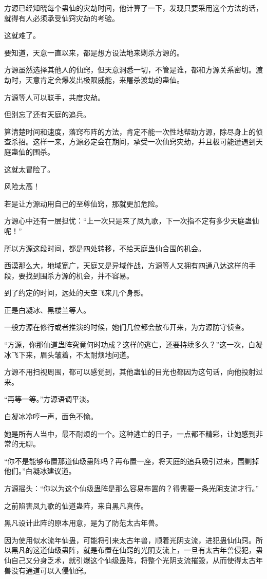 \begin{this_body}
方源已经知晓每个蛊仙的灾劫时间，他计算了一下，发现只要采用这个方法的话，就得有人必须承受仙窍灾劫的考验。

这就难了。

要知道，天意一直以来，都是想方设法地来剿杀方源的。

方源虽然选择其他人的仙窍，但天意洞悉一切，不管是谁，都和方源关系密切。渡劫时，天意肯定会爆发出极限威能，来屠杀渡劫的蛊仙。

方源等人可以联手，共度灾劫。

但别忘了还有天庭的追兵。

算清楚时间和速度，落窍布阵的方法，肯定不能一次性地帮助方源，除尽身上的侦查杀招。这样一来，方源必定会在期间，承受一次仙窍灾劫，并且极可能遭遇到天庭蛊仙的围杀。

这就太冒险了。

风险太高！

若是让方源动用自己的至尊仙窍，那就更加危险。

方源心中还有一层担忧：“上一次只是来了凤九歌，下一次指不定有多少天庭蛊仙呢！”

所以方源这段时间，都是四处转移，不给天庭蛊仙合围的机会。

西漠那么大，地域宽广，天庭又是异域作战，方源等人又拥有四通八达这样的手段，要找到围杀方源的机会，并不容易。

到了约定的时间，远处的天空飞来几个身影。

正是白凝冰、黑楼兰等人。

一般方源在修行或者推演的时候，她们几位都会散布开来，为方源防守侦查。

“方源，你那仙道蛊阵究竟何时功成？这样的逃亡，还要持续多久？”这一次，白凝冰飞下来，眉头皱着，不太耐烦地问道。

方源不用扫视周围，都可以感觉到，其他蛊仙的目光也都因为这句话，向他投射过来。

“再等一等。”方源语调平淡。

白凝冰冷哼一声，面色不愉。

她是所有人当中，最不耐烦的一个。这种逃亡的日子，一点都不精彩，让她感到非常的无聊。

“你不是能够布置那道仙级蛊阵吗？再布置一座，将天庭的追兵吸引过来，围剿掉他们。”白凝冰建议道。

方源摇头：“你以为这个仙级蛊阵是那么容易布置的？得需要一条光阴支流才行。”

之前陷害凤九歌的仙道蛊阵，来自黑凡真传。

黑凡设计此阵的原本用意，是为了防范太古年兽。

因为使用似水流年仙蛊，可能将引来太古年兽，顺着光阴支流，进犯蛊仙仙窍。所以黑凡的这道仙级蛊阵，就是布置在仙窍的光阴支流上，一旦有太古年兽侵犯，蛊仙自己又分身乏术，就引爆这个仙级蛊阵，将整个光阴支流摧毁，从而使得太古年兽没有通道可以入侵仙窍。


\end{this_body}
